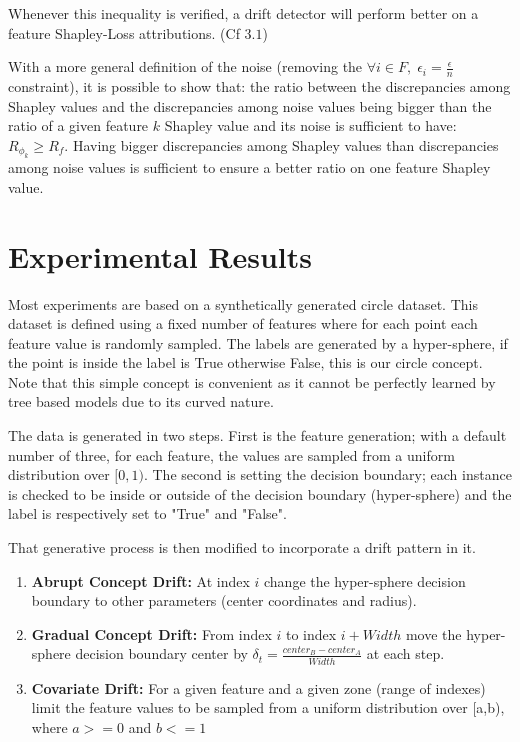 \documentclass[runningheads]{llncs}
\begin{document}
Whenever this inequality is verified, a drift detector will perform better on a feature Shapley-Loss attributions. (Cf $3.1$)%

With a more general definition of the noise (removing the $\forall i \in F,\; \epsilon_i = \frac{\epsilon}{n}$ constraint), it is possible to show that:
the ratio between the discrepancies among Shapley values and the discrepancies among noise values being bigger than the ratio of a given feature $k$ Shapley value and its noise is sufficient to have: $
R_{\phi_k} \geq R_f$.
Having bigger discrepancies among Shapley values than discrepancies among noise values is sufficient to ensure a better ratio on one feature Shapley value.




\section{Experimental Results}

Most experiments are based on a synthetically generated circle dataset. This dataset is defined using a fixed number of features where for each point each feature value is randomly sampled. The labels are generated by a hyper-sphere, if the point is inside the label is True otherwise False, this is our circle concept. Note that this simple concept is convenient as it cannot be perfectly learned by tree based models due to its curved nature.


The data is generated in two steps. First is the feature generation; with a default number of three, for each feature, the values are sampled from a uniform distribution over $[0, 1)$. The second is setting the decision boundary; each instance is checked to be inside or outside of the decision boundary (hyper-sphere) and the label is respectively set to "True" and "False". 

That generative process is then modified to incorporate a drift pattern in it. 
\begin{enumerate}
    \item \textbf{Abrupt Concept Drift:} At index $i$ change the hyper-sphere decision boundary to other parameters (center coordinates and radius). 
    \item \textbf{Gradual Concept Drift:} From index $i$ to index $i+Width$ move the hyper-sphere decision boundary center by $\delta_t= \frac{center_B - center_A}{Width}$ at each step.
    \item \textbf{Covariate Drift:} For a given feature and a given zone (range of indexes) limit the feature values to be sampled from a uniform distribution over [a,b), where $a>=0$ and $b<=1$
\end{enumerate}
\end{document}
